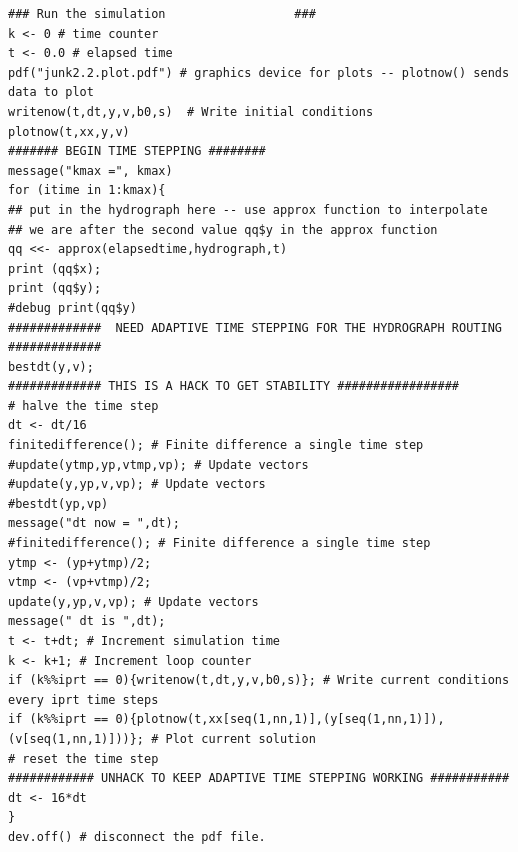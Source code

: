 \begin{lstlisting}[caption=R code for Lax Scheme, label=lst:Lax Scheme Implementation]
### Run the simulation                  ###
k <- 0 # time counter
t <- 0.0 # elapsed time
pdf("junk2.2.plot.pdf") # graphics device for plots -- plotnow() sends data to plot
writenow(t,dt,y,v,b0,s)  # Write initial conditions
plotnow(t,xx,y,v)
####### BEGIN TIME STEPPING ########
message("kmax =", kmax)
for (itime in 1:kmax){
## put in the hydrograph here -- use approx function to interpolate
## we are after the second value qq$y in the approx function
qq <<- approx(elapsedtime,hydrograph,t)
print (qq$x);
print (qq$y);
#debug print(qq$y) 
#############  NEED ADAPTIVE TIME STEPPING FOR THE HYDROGRAPH ROUTING #############
bestdt(y,v);
############# THIS IS A HACK TO GET STABILITY #################
# halve the time step 
dt <- dt/16 
finitedifference(); # Finite difference a single time step
#update(ytmp,yp,vtmp,vp); # Update vectors
#update(y,yp,v,vp); # Update vectors
#bestdt(yp,vp)
message("dt now = ",dt);
#finitedifference(); # Finite difference a single time step
ytmp <- (yp+ytmp)/2;
vtmp <- (vp+vtmp)/2;
update(y,yp,v,vp); # Update vectors
message(" dt is ",dt);
t <- t+dt; # Increment simulation time
k <- k+1; # Increment loop counter
if (k%%iprt == 0){writenow(t,dt,y,v,b0,s)}; # Write current conditions every iprt time steps
if (k%%iprt == 0){plotnow(t,xx[seq(1,nn,1)],(y[seq(1,nn,1)]),(v[seq(1,nn,1)]))}; # Plot current solution
# reset the time step
############ UNHACK TO KEEP ADAPTIVE TIME STEPPING WORKING ###########
dt <- 16*dt
}
dev.off() # disconnect the pdf file.
\end{lstlisting}

